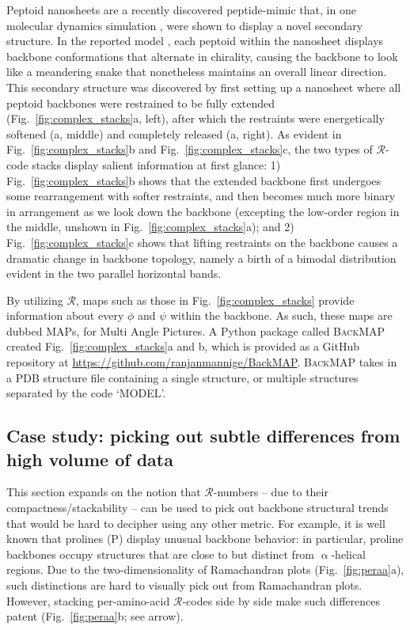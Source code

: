 \documentclass[fleqn,10pt,lineno]{wlpeerj} %
\newcommand{\Fig}[1]{Fig.~\ref{#1}}
\newcommand{\n}[1]{{\color{red}#1}}
\newcommand{\gname}{BackMAP}
\newcommand{\pname}{\textsc{\gname}\xspace}
\newcommand{\rr}{$\mathcal{R}$\xspace}
\begin{document}
Peptoid nanosheets are a recently discovered peptide-mimic that, in one molecular dynamics simulation \citep{Mannige2015}, were shown to display a novel secondary structure. In the reported model \citep{Mannige2015}, each peptoid within the nanosheet displays backbone conformations that alternate in chirality, causing the backbone to look like a meandering snake that nonetheless maintains an overall linear direction. This secondary structure was discovered by first setting up a nanosheet where all peptoid backbones were restrained to be fully extended (\Fig{fig:complex_stacks}a, left), after which the restraints were energetically softened (a, middle) and completely \n{released} (a, right). As evident in \Fig{fig:complex_stacks}b and \Fig{fig:complex_stacks}c, the two types of \rr-code stacks display salient information at first glance: 1) \Fig{fig:complex_stacks}b shows that the extended backbone first undergoes some rearrangement with softer restraints, and then becomes much more binary in arrangement as we look down the backbone (excepting the low-order region in the middle, unshown in \Fig{fig:complex_stacks}a); and 2) \Fig{fig:complex_stacks}c shows that lifting restraints on the backbone causes a dramatic change in backbone topology, namely a birth of a bimodal distribution evident in the two parallel horizontal bands.

By utilizing \rr, maps such as those in \Fig{fig:complex_stacks} provide information about every $\phi$ and $\psi$ within the backbone. As such, these maps are dubbed MAPs, for Multi Angle Pictures. A Python package called \pname created \Fig{fig:complex_stacks}a and b, which is provided as a GitHub repository at \url{https://github.com/ranjanmannige/\gname}. \pname takes in a PDB structure file containing a single structure, or multiple structures separated by the code `MODEL'.

\subsection*{Case study: picking out subtle differences from high volume of data}

This section expands on the notion that \rr-numbers -- due to their compactness/stackability -- can be used to pick out backbone structural trends that would be hard to decipher using any other metric. For example, it is well known that prolines (P) display unusual backbone behavior: in particular, proline backbones occupy structures that are close to but distinct from $\upalpha$-helical regions. Due to the two-dimensionality of Ramachandran plots (\Fig{fig:peraa}a), such distinctions are hard to visually pick out from Ramachandran plots. However, stacking per-amino-acid \rr-codes side by side make such differences patent (\Fig{fig:peraa}b; see arrow).
\end{document}
